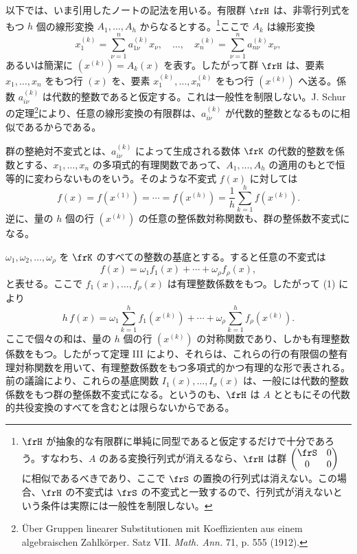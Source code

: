\documentclass[11pt]{article}
\begin{document}
以下では、いま引用したノートの記法を用いる。有限群 \(\frH\) は、非零行列式をもつ \(h\) 個の線形変換 \(A_1,\ldots,A_h\) からなるとする。\footnote{\(\frH\) が抽象的な有限群に単純に同型であると仮定するだけで十分であろう。すなわち、\(A\) のある変換行列式が消えるなら、\(\frH\) は群 \(\begin{pmatrix}\frS&0\\0&0\end{pmatrix}\) に相似であるべきであり、ここで \(\frS\) の置換の行列式は消えない。この場合、\(\frH\) の不変式は \(\frS\) の不変式と一致するので、行列式が消えないという条件は実際には一般性を制限しない。}ここで \(A_k\) は線形変換
\[
        x_1^{(k)}=\sum_{\nu=1}^{n}a_{1\nu}^{(k)}x_\nu,
        \quad\ldots,\quad
        x_n^{(k)}=\sum_{\nu=1}^{n}a_{n\nu}^{(k)}x_\nu,
\]
あるいは簡潔に \((x^{(k)})=A_k(x)\) を表す。したがって群 \(\frH\) は、要素 \(x_1,\ldots,x_n\) をもつ行 \((x)\) を、要素 \(x_1^{(k)},\ldots,x_n^{(k)}\) をもつ行 \((x^{(k)})\) へ送る。係数 \(a_{i\nu}^{(k)}\) は代数的整数であると仮定する。これは一般性を制限しない。J. Schur の定理\footnote{Über Gruppen linearer Substitutionen mit Koeffizienten aus einem algebraischen Zahlkörper. Satz VII. \emph{Math. Ann.} 71, p. 555 (1912).}により、任意の線形変換の有限群は、\(a_{i\nu}^{(k)}\) が代数的整数となるものに相似であるからである。

群の整絶対不変式とは、\(a_{i\nu}^{(k)}\) によって生成される数体 \(\frK\) の代数的整数を係数とする、\(x_1,\ldots,x_n\) の多項式的有理関数であって、\(A_1,\ldots,A_h\) の適用のもとで恒等的に変わらないものをいう。そのような不変式 \(f(x)\) に対しては
\begin{equation}
        f(x)=f(x^{(1)})=\cdots=f(x^{(h)})
        =\frac1h\sum_{k=1}^{h}f(x^{(k)}).
\end{equation}
逆に、量の \(h\) 個の行 \((x^{(k)})\) の任意の整係数対称関数も、群の整係数不変式になる。

\(\omega_1,\omega_2,\ldots,\omega_\rho\) を \(\frK\) のすべての整数の基底とする。すると任意の不変式は
\[
        f(x)=\omega_1 f_1(x)+\cdots+\omega_\rho f_\rho(x),
\]
と表せる。ここで \(f_1(x),\ldots,f_\rho(x)\) は有理整数係数をもつ。したがって (1) により
\[
        h\,f(x)
        =
        \omega_1\sum_{k=1}^{h}f_1(x^{(k)})
        +\cdots+
        \omega_\rho\sum_{k=1}^{h}f_\rho(x^{(k)}).
\]
ここで個々の和は、量の \(h\) 個の行 \((x^{(k)})\) の対称関数であり、しかも有理整数係数をもつ。したがって定理 III により、それらは、これらの行の有限個の整有理対称関数を用いて、有理整数係数をもつ多項式的かつ有理的な形で表される。前の議論により、これらの基底関数 \(I_1(x),\ldots,I_\sigma(x)\) は、一般には代数的整数係数をもつ群の整係数不変式になる。というのも、\(\frH\) は \(A\) とともにその代数的共役変換のすべてを含むとは限らないからである。
\end{document}

